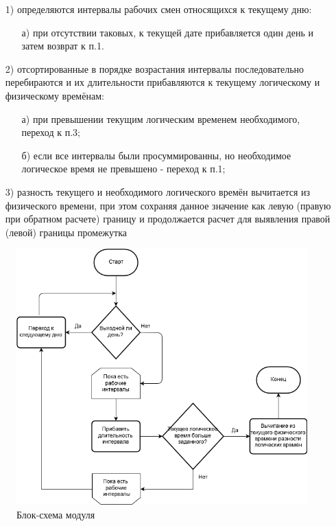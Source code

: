 \begin{enumerate}
	\item[1)] определяются интервалы рабочих смен относящихся к текущему дню:
	      \begin{enumerate}
		      \item[а)] при отсутствии таковых, к текущей дате прибавляется один день и затем возврат к п.1.
	      \end{enumerate}
	\item[2)] отсортированные в порядке возрастания интервалы последовательно перебираются и их длительности прибавляются к текущему логическому и физическому времёнам:
	      \begin{enumerate}
		      \item[а)] при превышении текущим логическим временем необходимого, переход к п.3;
		      \item[б)] если все интервалы были просуммированны, но необходимое логическое время не превышено - переход к п.1;
	      \end{enumerate}
	\item[3)] разность текущего и необходимого логического времён вычитается из физического времени, при этом сохраняя данное значение как левую (правую при обратном расчете) границу и продолжается расчет для выявления правой (левой) границы промежутка
\end{enumerate}

\begin{figure}[h]
	\includegraphics[width=\linewidth]{pics/scheduleSchema.png}
	\caption{Блок-схема модуля}
	\label{fig:schema}
	\centering
\end{figure}

